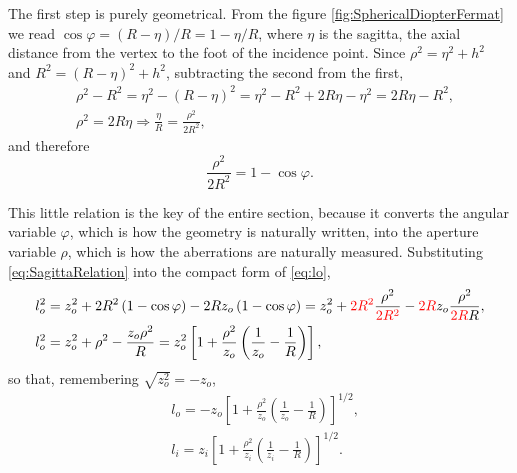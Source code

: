                The first step is purely geometrical. From the figure \ref{fig:SphericalDiopterFermat} we read $\cos\varphi = (R-\eta)/R = 1-\eta/R$, where $\eta$ is the sagitta, the axial distance from the vertex to the foot of the incidence point. Since $\rho^2 = \eta^2+h^2$ and $R^2 = (R-\eta)^2+h^2$, subtracting the second from the first,
                \begin{align*}
                    & \rho^2 - R^2 = \eta^2 - \left(R-\eta\right)^2 = \eta^2 - R^2 + 2R\eta - \eta^2 = 2R\eta - R^2,\\
                    & \rho^2 = 2R\eta \Longrightarrow \frac{\eta}{R} = \frac{\rho^2}{2R^2},
                \end{align*}
                and therefore
                \begin{equation}\label{eq:SagittaRelation}
                    \frac{\rho^2}{2R^2} = 1-\cos\varphi.
                \end{equation}

                This little relation is the key of the entire section, because it converts the angular variable $\varphi$, which is how the geometry is naturally written, into the aperture variable $\rho$, which is how the aberrations are naturally measured. Substituting \ref{eq:SagittaRelation} into the compact form of \ref{eq:lo},
                \begin{align*}
                    & l_o^2 = z_o^2 + 2R^2\left(1-\cos\varphi\right) - 2Rz_o\left(1-\cos\varphi\right) = z_o^2 + {\color{red}2R^2}\frac{\rho^2}{{\color{red}2R^2}} - {\color{red}2R}z_o\frac{\rho^2}{{\color{red}2R}R},\\
                    & l_o^2 = z_o^2 + \rho^2 - \frac{z_o\rho^2}{R} = z_o^2\left[ 1 + \frac{\rho^2}{z_o}\left( \frac{1}{z_o} - \frac{1}{R} \right) \right],
                \end{align*}
                so that, remembering $\sqrt{z_o^2}=-z_o$,
                \begin{align}
                    & l_o = -z_o\left[ 1 + \frac{\rho^2}{z_o}\left( \frac{1}{z_o}-\frac{1}{R} \right) \right]^{1/2},\label{eq:loExpanded}\\
                    & l_i = z_i\left[ 1 + \frac{\rho^2}{z_i}\left( \frac{1}{z_i}-\frac{1}{R} \right) \right]^{1/2}.\label{eq:liExpanded}
                \end{align}

